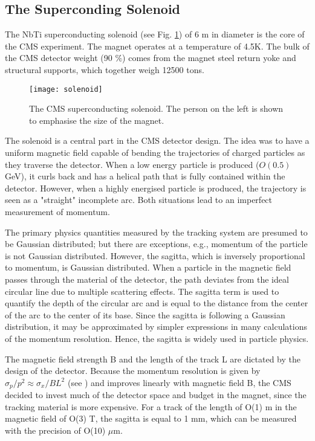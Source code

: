 \begin{normalsize}



\subsection{The Superconding Solenoid}


The NbTi superconducting solenoid (see Fig. \ref{solenoid}) of 6 m in diameter is the core of the CMS experiment. The magnet operates at a temperature of 4.5K. The bulk of the CMS detector weight (90 $\%$) comes from the magnet steel return yoke and structural supports, which together weigh 12500 tons.
 
 \begin{figure}[H]
  \centering
  \texttt{[image: solenoid]}
  \caption[The CMS superconducting solenoid]{The CMS superconducting solenoid. The person on the left is shown to emphasise the size of the magnet.}
  \label{solenoid}
\end{figure}

The solenoid is a central part in the CMS detector design. The idea was to have a uniform magnetic field capable of bending the trajectories of charged particles as they traverse the detector. When a low energy particle is produced ($O(0.5)$ GeV), it curls back and has a helical path that is fully contained within the detector. However, when a highly energised particle is produced, the trajectory is seen as a "straight" incomplete arc. Both situations lead to an imperfect measurement of momentum. 

The primary physics quantities measured by the tracking system are presumed to be Gaussian distributed; but there are exceptions, e.g., momentum of the particle is not Gaussian distributed. However, the sagitta, which is inversely proportional to momentum, is Gaussian distributed. When a particle in the magnetic field passes through the material of the detector, the path deviates from the ideal circular line due to multiple scattering effects. The sagitta term is used to quantify the depth of the circular arc and is equal to the distance from the center of the arc to the center of its base. Since the sagitta is following a Gaussian distribution, it may be approximated by simpler expressions in many calculations of the momentum resolution. Hence, the sagitta is widely used in particle physics. 

The magnetic field strength B and the length of the track L are dictated by the design of the detector. Because the momentum resolution is given by $\sigma_p / p^2 \approx \sigma_x / B L^2 $ (see \cite {Hauptman:2011zza}) and improves linearly with magnetic field B, the CMS decided to invest much of the detector space and budget in the magnet, since the tracking material is more expensive. For a track of the length of O(1) m in the magnetic field of O(3) T, the sagitta is equal to 1 mm, which can be measured with the precision of O(10) $\mu$m.



\end{normalsize}

